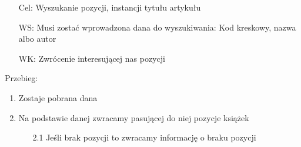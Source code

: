 \documentclass{article}
\begin{document}
		\normalsize
	\begin{enumerate}
		\item[Cel:] Wyszukanie pozycji, instancji tytułu artykułu
		\item[WS:] Musi zostać wprowadzona dana do wyszukiwania: Kod kreskowy, nazwa albo autor
		\item[WK:] Zwrócenie interesującej nas pozycji
	\end{enumerate}
	Przebieg:
	\begin{enumerate}
		\item Zostaje pobrana dana
		\item Na podstawie danej zwracamy pasującej do niej pozycje książek
		\begin{enumerate}
		\item [2.1] Jeśli brak pozycji to zwracamy informację o braku pozycji
		\end{enumerate}
	\end{enumerate}
\end{document}
